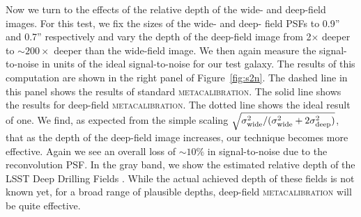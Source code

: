 \documentclass[twocolumn]{openjournal}
\makeatletter
\newcommand{\mcal}{\textsc{metacalibration}\@\xspace}
\makeatother
\begin{document}
Now we turn to the effects of the relative depth of the wide- and deep-field images. For
this test, we fix the sizes of the wide- and deep- field PSFs to 0.9'' and 0.7''
respectively and vary the depth of the deep-field image from 2$\times$ deeper to
$\sim200\times$ deeper than the wide-field image. We then again measure the
signal-to-noise in units of the ideal signal-to-noise for our test galaxy. The results
of this computation are shown in the right panel of Figure~\ref{fig:s2n}. The dashed
line in this panel shows the results of standard \mcal. The solid line shows the results
for deep-field \mcal. The dotted line shows the ideal result of one. We find, as
expected from the simple scaling
$\sqrt{\sigma^2_{\rm wide}/(\sigma^2_{\rm wide} + 2\sigma^2_{\rm deep})}$,
that as the depth of the deep-field image increases, our
technique becomes more effective. Again we see an overall loss of $\sim10\%$ in
signal-to-noise due to the reconvolution PSF. In the gray band, we show the estimated
relative depth of the LSST Deep Drilling Fields \citep[DDF,][]{lsst-ddf-depth}. While
the actual achieved depth of these fields is not known yet, for a broad range of
plausible depths, deep-field \mcal will be quite effective.
\end{document}
